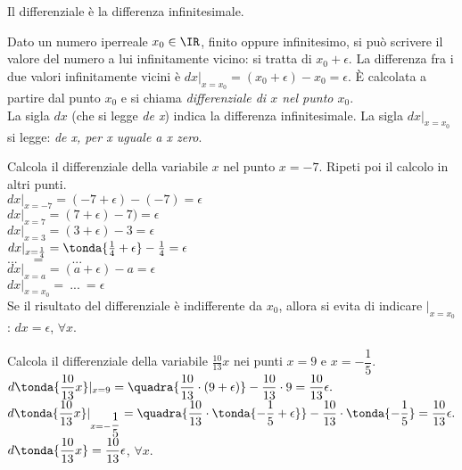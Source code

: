 \begin{definizione}
 Il differenziale è la differenza infinitesimale.
\end{definizione}

Dato un numero iperreale $x_0\in\IR$, finito oppure infinitesimo, si può 
scrivere il valore del numero a lui infinitamente vicino: si tratta di 
$x_0+\epsilon$. La differenza fra i due valori infinitamente vicini è 
$dx|_{x=x_0}=(x_0+\epsilon)-x_0=\epsilon$.
È calcolata a partire dal punto $x_0$ e si chiama \emph{differenziale di $x$ 
nel punto $x_0$}.\\
La sigla $dx$ (che si legge \emph{de x}) indica la differenza infinitesimale.
La sigla $dx|_{x=x_0}$ si legge: \emph{de x, per x uguale a x zero}. 

\begin{esempio}
 Calcola il differenziale della variabile $x$ nel punto $x=-7$. Ripeti poi il 
 calcolo in altri punti.\\
  $dx|_{x=-7} =(-7+\epsilon)-(-7)=\epsilon$\\
  $dx|_{x=7} =(7+\epsilon)-7)=\epsilon$\\
  $dx|_{x=3} =(3+\epsilon)-3=\epsilon$\\
  $dx|_{x=\frac{1}{4}} = \tonda{\frac{1}{4}+\epsilon}-\frac{1}{4}=\epsilon$\\
  $...\quad = \qquad ...$\\
  $dx|_{x=a}  =(a+\epsilon)-a=\epsilon$\\
  $dx|_{x=x_0}  =\ ...\ =\epsilon$\\
  Se il risultato del differenziale è indifferente da $x_0$, allora si evita 
di 
  indicare $|_{x=x_0}$: $dx=\epsilon$, $\forall x$. 
\end{esempio}

\begin{esempio}
 Calcola il differenziale della variabile $\frac{10}{13}x$ nei punti $x=9$ e 
 $x=-\dfrac{1}{5}$.\\
 
$d\tonda{\dfrac{10}{13}x}|_{x=9}=\quadra{\dfrac{10}{13}\cdot(9+\epsilon)}-
  \dfrac{10}{13}\cdot 9 = \dfrac{10}{13}\epsilon.$\\
 
$d\tonda{\dfrac{10}{13}x}|_{x=-\dfrac{1}{5}}=\quadra{\dfrac{10}{13}\cdot
  \tonda{-\dfrac{1}{5}+\epsilon}}-
 \dfrac{10}{13}\cdot \tonda{-\dfrac{1}{5}}= \dfrac{10}{13}\epsilon.$\\
 $d\tonda{\dfrac{10}{13}x}=\dfrac{10}{13}\epsilon$, $\forall x$.
 \end{esempio}

